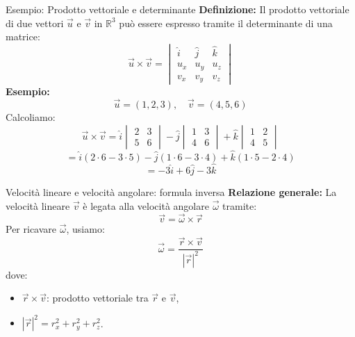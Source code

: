 \documentclass{beamer}
\begin{document}
\begin{frame}{Esempio: Prodotto vettoriale e determinante}
    \textbf{Definizione:} Il prodotto vettoriale di due vettori $\vec{u}$ e $\vec{v}$ in $\mathbb{R}^3$ può essere espresso tramite il determinante di una matrice:
$$
    \vec{u} \times \vec{v} = \begin{vmatrix}
    \hat{i} & \hat{j} & \hat{k} \\
    u_x & u_y & u_z \\
    v_x & v_y & v_z
    \end{vmatrix}
$$
    \textbf{Esempio:}
$$
    \vec{u} = (1, 2, 3), \quad \vec{v} = (4, 5, 6)
$$
    Calcoliamo:
$$
    \vec{u} \times \vec{v} = \hat{i} \begin{vmatrix}
    2 & 3 \\
    5 & 6
    \end{vmatrix}
    - \hat{j} \begin{vmatrix}
    1 & 3 \\
    4 & 6
    \end{vmatrix}
    + \hat{k} \begin{vmatrix}
    1 & 2 \\
    4 & 5
    \end{vmatrix}
$$
$$
    = \hat{i} (2 \cdot 6 - 3 \cdot 5) - \hat{j} (1 \cdot 6 - 3 \cdot 4) + \hat{k} (1 \cdot 5 - 2 \cdot 4)
$$
$$
    = -3\hat{i} + 6\hat{j} - 3\hat{k}
$$
\end{frame}

\begin{frame}{Velocità lineare e velocità angolare: formula inversa}
    \textbf{Relazione generale:}
    La velocità lineare $\vec{v}$ è legata alla velocità angolare $\vec{\omega}$ tramite:
$$
    \vec{v} = \vec{\omega} \times \vec{r}
$$
    Per ricavare $\vec{\omega}$, usiamo:
$$
    \vec{\omega} = \frac{\vec{r} \times \vec{v}}{|\vec{r}|^2}
$$
    dove:
    \begin{itemize}
        \item $\vec{r} \times \vec{v}$: prodotto vettoriale tra $\vec{r}$ e $\vec{v}$,
        \item $|\vec{r}|^2 = r_x^2 + r_y^2 + r_z^2$.
    \end{itemize}
\end{frame}
\end{document}
